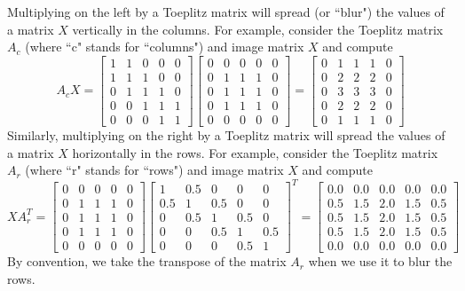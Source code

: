 \begin{note}
Multiplying on the left by a Toeplitz matrix will spread (or ``blur") the values of a matrix $X$ vertically in the columns. For example, consider the Toeplitz matrix $A_c$ (where ``c" stands for ``columns") and image matrix $X$ and compute
$$
A_c X =
\begin{bmatrix}
1 & 1 & 0 & 0 & 0 \\
1 & 1 & 1 & 0 & 0 \\
0 & 1 & 1 & 1 & 0 \\
0 & 0 & 1 & 1 & 1 \\
0 & 0 & 0 & 1 & 1
\end{bmatrix}
\begin{bmatrix}
0 & 0 & 0 & 0 & 0 \\
0 & 1 & 1 & 1 & 0 \\
0 & 1 & 1 & 1 & 0 \\
0 & 1 & 1 & 1 & 0 \\
0 & 0 & 0 & 0 & 0
\end{bmatrix}
=
\begin{bmatrix}
0 & 1 & 1 & 1 & 0 \\
0 & 2 & 2 & 2 & 0 \\
0 & 3 & 3 & 3 & 0 \\
0 & 2 & 2 & 2 & 0 \\
0 & 1 & 1 & 1 & 0
\end{bmatrix}
$$
Similarly, multiplying on the right by a Toeplitz matrix will spread the values of a matrix $X$ horizontally in the rows. For example, consider the Toeplitz matrix $A_r$ (where ``r" stands for ``rows") and image matrix $X$ and compute
$$
X A_r^T =
\begin{bmatrix}
0 & 0 & 0 & 0 & 0 \\
0 & 1 & 1 & 1 & 0 \\
0 & 1 & 1 & 1 & 0 \\
0 & 1 & 1 & 1 & 0 \\
0 & 0 & 0 & 0 & 0
\end{bmatrix}
\begin{bmatrix}
1 & 0.5 & 0 & 0 & 0 \\
0.5 & 1 & 0.5 & 0 & 0 \\
0 & 0.5 & 1 & 0.5 & 0 \\
0 & 0 & 0.5 & 1 & 0.5 \\
0 & 0 & 0 & 0.5 & 1
\end{bmatrix}^T
=
\begin{bmatrix}
0.0 & 0.0 & 0.0 & 0.0 & 0.0 \\
0.5 & 1.5 & 2.0 & 1.5 & 0.5 \\
0.5 & 1.5 & 2.0 & 1.5 & 0.5 \\
0.5 & 1.5 & 2.0 & 1.5 & 0.5 \\
0.0 & 0.0 & 0.0 & 0.0 & 0.0
\end{bmatrix}
$$
By convention, we take the transpose of the matrix $A_r$ when we use it to blur the rows.
\end{note}

